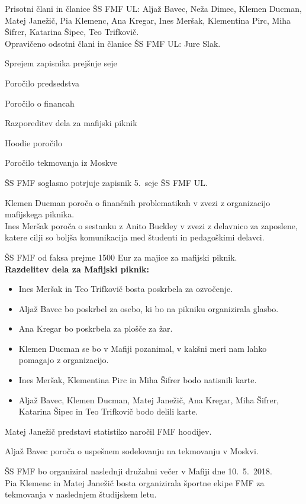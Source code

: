 \documentclass{seja}
\begin{document}
Prisotni člani in članice ŠS FMF UL:
Aljaž Bavec,
Neža Dimec,
Klemen Ducman,
Matej Janežič,
Pia Klemenc,
Ana Kregar,
Ines Meršak,
Klementina Pirc,
Miha Šifrer,
Katarina Šipec,
Teo Trifkovič.
\\
Opravičeno odsotni člani in članice ŠS FMF UL:
Jure Slak.


\begin{red*}
  \item Sprejem zapisnika prejšnje seje
  \item Poročilo predsedstva
  \item Poročilo o financah
  \item Razporeditev dela za mafijski piknik
  \item Hoodie poročilo
  \item Poročilo tekmovanja iz Moskve
\end{red*}

\begin{ad}
	\item
	ŠS FMF soglasno potrjuje zapisnik 5.~seje ŠS FMF UL.
	\item 
	Klemen Ducman poroča o finančnih problematikah v zvezi z organizacijo mafijskega piknika. \\
	Ines Meršak poroča o sestanku z Anito Buckley v zvezi z delavnico za zaposlene, katere cilji so boljša komunikacija med študenti in pedagoškimi delavci.
	\item
	ŠS FMF od faksa prejme 1500 Eur za majice za mafijski piknik.\\
	\textbf{Razdelitev dela za Mafijski piknik:}
	\begin{itemize}
		\item 
		Ines Meršak in Teo Trifkovič bosta poskrbela za ozvočenje.
		\item 
		Aljaž Bavec bo poskrbel za osebo, ki bo na pikniku organizirala glasbo.
		\item 	
		Ana Kregar bo poskrbela za plošče za žar.
		\item 
		Klemen Ducman se bo v Mafiji pozanimal, v kakšni meri nam lahko pomagajo z organizacijo.
		\item 
		Ines Meršak, Klementina Pirc in Miha Šifrer bodo natisnili karte.
		\item 
		Aljaž Bavec, Klemen Ducman, Matej Janežič, Ana Kregar, Miha Šifrer, Katarina Šipec in Teo Trifkovič bodo delili karte.
	\end{itemize}	
	\item 
	Matej Janežič predstavi statistiko naročil FMF hoodijev.
	\item 
	Aljaž Bavec poroča o uspešnem sodelovanju na tekmovanju v Moskvi.
	\item
	ŠS FMF bo organiziral naslednji družabni večer v Mafiji dne 10.~5.~2018. \\
	Pia Klemenc in Matej Janežič bosta organizirala športne ekipe FMF za tekmovanja v naslednjem študijskem letu.
\end{ad}
\end{document}
